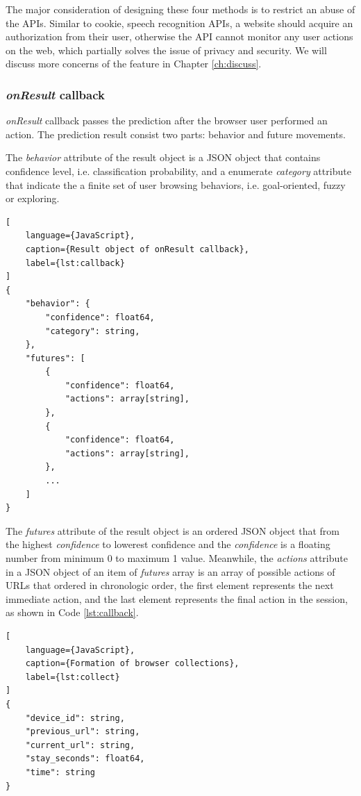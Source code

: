 The major consideration of designing these four methods is to restrict an abuse of the APIs.
Similar to cookie, speech recognition APIs, a website should acquire an authorization from
their user, otherwise the API cannot monitor any user actions on the web, which partially
solves the issue of privacy and security. We will discuss more concerns of the feature in
Chapter \ref{ch:discuss}.

\subsubsection{\emph{onResult} callback}

\emph{onResult} callback passes the prediction after the browser user performed an action.
The prediction result consist two parts: behavior and future movements.

The \emph{behavior} attribute of the result object is a JSON object that contains 
confidence level, i.e. classification probability, and a enumerate \emph{category} attribute
that indicate the a finite set of user browsing behaviors, i.e. goal-oriented, fuzzy or exploring.

\begin{lstlisting}[
    language={JavaScript},
    caption={Result object of onResult callback},
    label={lst:callback}
]
{
    "behavior": {
        "confidence": float64,
        "category": string,
    },
    "futures": [
        {
            "confidence": float64,
            "actions": array[string],
        },
        {
            "confidence": float64,
            "actions": array[string],
        },
        ...
    ]
}
\end{lstlisting}

The \emph{futures} attribute of the result object is an ordered JSON object that from the
highest \emph{confidence} to lowerest {confidence} and the \emph{confidence} is a floating
number from minimum 0 to maximum 1 value. Meanwhile, the \emph{actions} attribute in a 
JSON object of an item of \emph{futures} array is an array of possible actions of URLs that
ordered in chronologic order, the first element represents the next immediate action,
and the last element represents the final action in the session, as shown in Code \ref{lst:callback}.

\begin{lstlisting}[
    language={JavaScript},
    caption={Formation of browser collections},
    label={lst:collect}
]
{
    "device_id": string,
    "previous_url": string,
    "current_url": string,
    "stay_seconds": float64,
    "time": string
}
\end{lstlisting}

